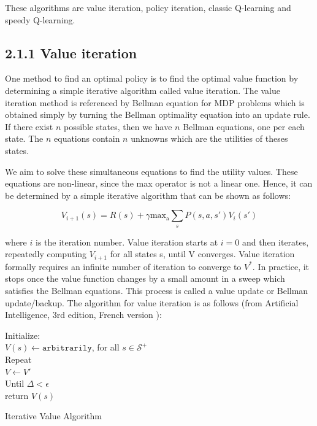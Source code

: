\documentclass[a4paper, 12pt]{report}
\begin{document}
These algorithms are value iteration, policy iteration, classic Q-learning and speedy Q-learning.

\subsection*{2.1.1 Value iteration}

One method to find an optimal policy is to find the optimal value function by determining a simple iterative algorithm called value iteration.
The value iteration method is referenced by Bellman equation for MDP problems which is obtained simply by turning the Bellman optimality equation into an update rule.
If there exist $n$ possible states, then we have $n$ Bellman equations, one per each state.
The $n$ equations contain $n$ unknowns which are the utilities of theses states. 

We aim to solve these simultaneous equations to find the utility values.
These equations are non-linear, since the max operator is not a linear one.
Hence, it can be determined by a simple iterative algorithm that can be shown as follows:

\[V_{i+1}(s) = R(s) + \gamma \mathrm{max_a} \sum_s P(s,a,s') V_{i}(s')\]

where $i$ is the iteration number.
Value iteration starts at $i = 0$ and then iterates, repeatedly computing $V_{i+1}$ for all states s, until V converges.
Value iteration formally requires an infinite number of iteration to converge to $V^*$.
In practice, it stops once the value function changes by a small amount in a sweep which satisfies the Bellman equations.
This process is called a value update or Bellman update/backup. 
The algorithm for value iteration is as follows (from Artificial Intelligence, 3rd edition, French version \cite{Russell-2010}):

  
\begin{algorithm}[H]
    Initialize:\\  
    $V(s) \gets \texttt{arbitrarily}$, for all $s \in \mathcal S^+$\\
    Repeat\\
    $V \gets V'$ \\
    Until {$\Delta < \epsilon$}\\
    return $V(s)$
\caption{Iterative Value Algorithm}
\end{algorithm}
\end{document}
